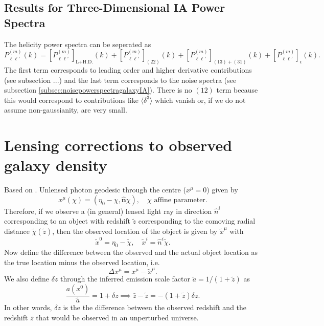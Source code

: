\documentclass[11pt]{article}
\begin{document}
\subsection{Results for Three-Dimensional IA Power Spectra}
The helicity power spectra can be seperated as
\begin{equation}
    P_{\ell \ell'}^{(m)}(k) = [P^{(m)}_{\ell\ell'}]_{\text{L+H.D.}}(k) + [P^{(m)}_{\ell\ell'}]_{(22)}(k) + [P^{(m)}_{\ell\ell'}]_{(13) + (31)}(k) + [P^{(m)}_{\ell\ell'}]_{\epsilon}(k).
\end{equation}
The first term corresponds to leading order and higher derivative contributions (see subsection ...) %
and the last term corresponds to the noise spectra (see subsection \ref{subsec:noisepowerspectragalaxyIA}). There is no $(12)$ term because this would correspond to contributions like $\langle \delta^3 \rangle$ which vanish or, if we do not assume non-gaussianity, are very small.

\section{Lensing corrections to observed galaxy density}
Based on \cite{Schmidt2013_clustering}. Unlensed photon geodesic through the centre ($x^\mu = 0$) given by
$$
x^\mu(\chi) = (\eta_0-\chi, \hat{\mathbf n}\chi), \quad \chi \text{ affine parameter.}
$$
Therefore, if we observe a (in general) lensed light ray in direction $\hat n^i$ corresponding to an object with redshift $\tilde z$ corresponding to the comoving radial distance $\tilde \chi(\tilde z)$, then the observed location of the object is given by $\tilde x^\mu$ with
\begin{equation}
    \tilde x^0 = \eta_0 - \tilde \chi, \quad \tilde x^i = \hat n^i \tilde \chi.
\end{equation}
Now define the difference between the observed and the actual object location as the true location minus the observed location, i.e.
\begin{equation}
    \Delta x^\mu = x^{\mu} - \tilde x^\mu.
\end{equation}
We also define $\delta z$ through the inferred emission scale factor $\tilde a = 1/(1+\tilde z)$ as
\begin{equation}
    \frac{a(x^0)}{\tilde a} = 1+\delta z \implies \bar z - \tilde z = -(1+\tilde z)\delta z.
\end{equation}
In other words, $\delta z$ is the the difference between the observed redshift and the redshift $\bar z$ that would be observed in an unperturbed universe.
\end{document}
